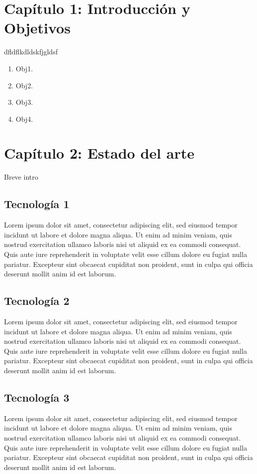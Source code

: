 \chapter{Cap\'itulo 1: Introducción y Objetivos}
 dfldflkdldskfjgldsf \cite{morenoguerrero11}
\begin{enumerate}
\item  Obj1.
\item  Obj2.
\item  Obj3.
\item  Obj4.
\end{enumerate}
 

\chapter{Cap\'itulo 2: Estado del arte}
Breve intro
\section{Tecnología 1}
Lorem ipsum dolor sit amet, consectetur adipiscing elit, sed eiusmod tempor incidunt ut labore et dolore magna aliqua. Ut enim ad minim veniam, quis nostrud exercitation ullamco laboris nisi ut aliquid ex ea commodi consequat. Quis aute iure reprehenderit in voluptate velit esse cillum dolore eu fugiat nulla pariatur. Excepteur sint obcaecat cupiditat non proident, sunt in culpa qui officia deserunt mollit anim id est laborum.
\section{Tecnología 2}
Lorem ipsum dolor sit amet, consectetur adipiscing elit, sed eiusmod tempor incidunt ut labore et dolore magna aliqua. Ut enim ad minim veniam, quis nostrud exercitation ullamco laboris nisi ut aliquid ex ea commodi consequat. Quis aute iure reprehenderit in voluptate velit esse cillum dolore eu fugiat nulla pariatur. Excepteur sint obcaecat cupiditat non proident, sunt in culpa qui officia deserunt mollit anim id est laborum.
\section{Tecnología 3}
 Lorem ipsum dolor sit amet, consectetur adipiscing elit, sed eiusmod tempor incidunt ut labore et dolore magna aliqua. Ut enim ad minim veniam, quis nostrud exercitation ullamco laboris nisi ut aliquid ex ea commodi consequat. Quis aute iure reprehenderit in voluptate velit esse cillum dolore eu fugiat nulla pariatur. Excepteur sint obcaecat cupiditat non proident, sunt in culpa qui officia deserunt mollit anim id est laborum.
 
